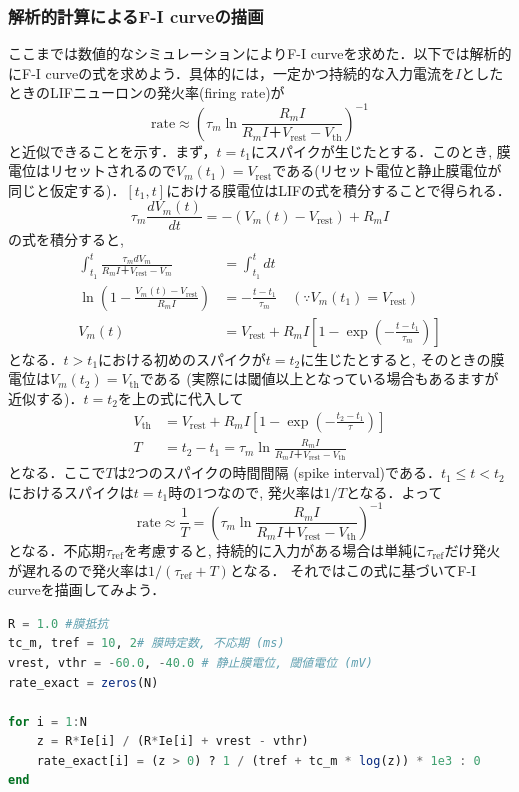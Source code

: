 \subsubsection{解析的計算によるF-I curveの描画}
ここまでは数値的なシミュレーションによりF-I curveを求めた．以下では解析的にF-I curveの式を求めよう．具体的には，一定かつ持続的な入力電流を$I$としたときのLIFニューロンの発火率(firing rate)が
\begin{equation}
\text{rate}\approx \left(\tau_m \ln \frac{R_mI}{R_mI＋V_\text{rest}-V_{\text{th}}}\right)^{-1}
\end{equation}
と近似できることを示す．まず，$t=t_1$にスパイクが生じたとする．このとき, 膜電位はリセットされるので$V_m(t_1)=V_\text{rest}$である(リセット電位と静止膜電位が同じと仮定する)．$[t_1, t]$における膜電位はLIFの式を積分することで得られる．
\begin{equation}
\tau_m \frac{dV_{m}(t)}{dt}=-(V_{m}(t)-V_\text{rest})+R_m I
\end{equation}
の式を積分すると, 
\begin{align}
\int_{t_1}^{t} \frac{\tau_m dV_m}{R_mI＋V_\text{rest}-V_m}&=\int_{t_1}^{t} dt\\
\ln \left(1-\frac{V_m(t)-V_\text{rest}}{R_mI}\right)&=-\frac{t-t_1}{\tau_m} \quad (\because V_m(t_1)=V_\text{rest})\\
V_m(t) &=V_\text{rest} + R_mI\left[1-\exp\left(-\frac{t-t_1}{\tau_m}\right)\right] 
\end{align}
となる．$t>t_1$における初めのスパイクが$t=t_2$に生じたとすると, そのときの膜電位は$V_m(t_2)=V_{\text{th}}$である (実際には閾値以上となっている場合もあるますが近似する)．$t=t_2$を上の式に代入して
\begin{align}
V_{\text{th}}&=V_\text{rest} + R_mI\left[1-\exp\left(-\frac{t_2-t_1}{\tau}\right)\right] \\
T&= t_2-t_1 = \tau_m \ln \frac{R_mI}{R_mI＋V_\text{rest}-V_{\text{th}}}
\end{align}
となる．ここで$T$は2つのスパイクの時間間隔 (spike interval)である．$t_1\leq t<t_2$におけるスパイクは$t=t_1$時の1つなので, 発火率は$1/T$となる．よって
\begin{equation}
\text{rate}\approx \frac{1}{T}=\left(\tau_m \ln \frac{R_mI}{R_mI＋V_\text{rest}-V_{\text{th}}}\right)^{-1}
\end{equation}
となる．不応期$\tau_{\text{ref}}$を考慮すると, 持続的に入力がある場合は単純に$\tau_{\text{ref}}$だけ発火が遅れるので発火率は$1/(\tau_{\text{ref}}+T)$となる．
それではこの式に基づいてF-I curveを描画してみよう．
\begin{lstlisting}[language=julia]
R = 1.0 #膜抵抗 
tc_m, tref = 10, 2# 膜時定数, 不応期 (ms)
vrest, vthr = -60.0, -40.0 # 静止膜電位, 閾値電位 (mV)
rate_exact = zeros(N)

for i = 1:N
    z = R*Ie[i] / (R*Ie[i] + vrest - vthr)
    rate_exact[i] = (z > 0) ? 1 / (tref + tc_m * log(z)) * 1e3 : 0
end 
\end{lstlisting}
